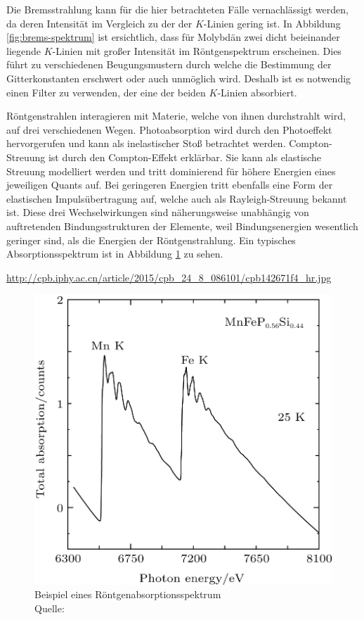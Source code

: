 			Die Bremsstrahlung kann für die hier betrachteten Fälle vernachlässigt werden, da deren Intensität im Vergleich zu der der $K$-Linien gering ist.
			In Abbildung \ref{fig:brems-spektrum} ist ersichtlich, dass für Molybdän zwei dicht beieinander liegende $K$-Linien mit großer Intensität im Röntgenspektrum erscheinen.
			Dies führt zu verschiedenen Beugungsmustern durch welche die Bestimmung der Gitterkonstanten erschwert oder auch unmöglich wird.
			Deshalb ist es notwendig einen Filter zu verwenden, der eine der beiden $K$-Linien absorbiert.

			Röntgenstrahlen interagieren mit Materie, welche von ihnen durchstrahlt wird, auf drei verschiedenen Wegen.
			Photoabsorption wird durch den Photoeffekt hervorgerufen und kann als inelastischer Stoß betrachtet werden.
			Compton-Streuung ist durch den Compton-Effekt erklärbar.
			Sie kann als elastische Streuung modelliert werden und tritt dominierend für höhere Energien eines jeweiligen Quants auf.
			Bei geringeren Energien tritt ebenfalls eine Form der elastischen Impulsübertragung auf, welche auch als Rayleigh-Streuung bekannt ist.
			Diese drei Wechselwirkungen sind näherungsweise unabhängig von auftretenden Bindungsstrukturen der Elemente, weil Bindungsenergien wesentlich geringer sind, als die Energien der Röntgenstrahlung.
			Ein typisches Absorptionsspektrum ist in Abbildung \ref{fig:x-ray-absorp-spec} zu sehen.

			\url{http://cpb.iphy.ac.cn/article/2015/cpb_24_8_086101/cpb142671f4_hr.jpg}
			\begin{figure}[htb]
				\centering
				\includegraphics[scale=1.1]{images/x-ray-absorption-spec.jpg}
				\caption{Beispiel eines Röntgenabsorptionsspektrum \\ Quelle: }
				\label{fig:x-ray-absorp-spec}
			\end{figure}

